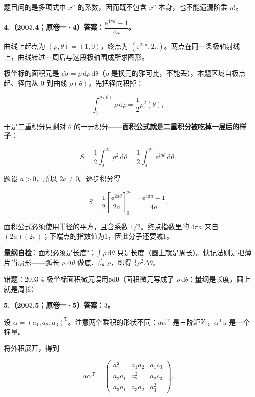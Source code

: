 \documentclass[UTF8,11pt,fontset=windows]{ctexart}
\begin{document}
题目问的是多项式中 $x^n$ 的系数，因而既不包含 $x^n$ 本身，也不能遗漏阶乘 $n!$。

\clearpage

\textbf{4.（2003.4；原卷一·4）答案：$\dfrac{\mathrm e^{4\pi a}-1}{4a}$。}

曲线上起点为 $(\rho,\theta)=(1,0)$，终点为 $(\mathrm e^{2\pi a},2\pi)$。两点在同一条极轴射线上，曲线转过一周后与这段极轴围成所求图形。

极坐标的面积元是 $d\sigma=\rho\,\mathrm d\rho\,\mathrm d\theta$（$\rho$ 是换元的雅可比，不能丢）。本题区域自极点起、径向从 $0$ 到曲线 $\rho(\theta)$，先把径向积掉：

$$
\int_0^{\rho(\theta)}\rho\,\mathrm d\rho=\frac12\rho^{2}(\theta),
$$

于是二重积分只剩对 $\theta$ 的一元积分——\textbf{面积公式就是二重积分被吃掉一层后的样子}：

$$
S=\frac12\int_0^{2\pi}\rho^2\,\mathrm d\theta
=\frac12\int_0^{2\pi}\mathrm e^{2a\theta}\,\mathrm d\theta.
$$

题设 $a>0$，所以 $2a\ne0$。逐步积分得

$$
S=\frac12\left[\frac{\mathrm e^{2a\theta}}{2a}\right]_0^{2\pi}
=\boxed{\frac{\mathrm e^{4\pi a}-1}{4a}}.
$$

面积公式必须使用半径的平方，且含系数 $1/2$。终点指数里的 $4\pi a$ 来自 $(2a)(2\pi)$；下端点的指数值为1，因此分子还要减1。

\textbf{量纲自检}：面积必须是长度²；$\int\rho\,\mathrm d\theta$ 只是长度（圆上就是周长）。快记法则是把薄片当扇形——弧长 $\rho\,\Delta\theta$ 做底、高 $\rho$，即得 $\tfrac12\rho^2\Delta\theta$。

\begingroup\color{gray}错题：2003-4 极坐标面积微元误用ρdθ（面积微元写成了 $\rho\,\mathrm d\theta$：量纲是长度，圆上就是周长）\par\endgroup

\clearpage

\textbf{5.（2003.5；原卷一·5）答案：$3$。}

设 $\alpha=(a_1,a_2,a_3)^{\mathrm T}$。注意两个乘积的形状不同：$\alpha\alpha^{\mathrm T}$ 是三阶矩阵，$\alpha^{\mathrm T}\alpha$ 是一个标量。

将外积展开，得到

$$
\alpha\alpha^{\mathrm T}
=\begin{pmatrix}
a_1^2&a_1a_2&a_1a_3\\
a_2a_1&a_2^2&a_2a_3\\
a_3a_1&a_3a_2&a_3^2
\end{pmatrix}.
$$
\end{document}
